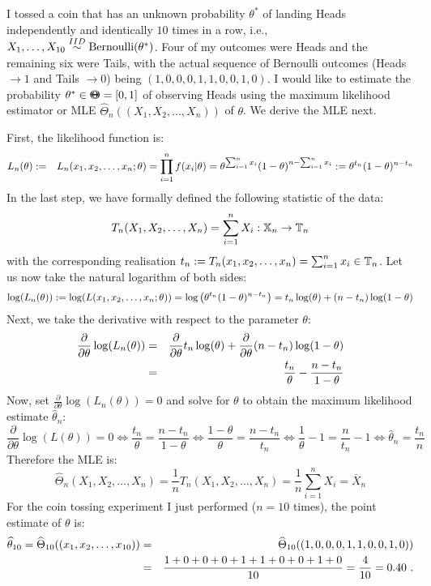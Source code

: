 {\begin{example}\label{EX:CoinTossingML}
I tossed a coin that has an unknown probability $\theta^*$ of landing Heads independently and identically $10$ times in a row, i.e., $X_1,\ldots,X_{10} \overset{IID}{\sim} \mbox{{\rm Bernoulli}}(\theta^*)$.  Four of my outcomes were Heads and the remaining six were Tails, with the actual sequence of Bernoulli outcomes (Heads $\to 1$ and Tails $\to 0$) being $(1,0,0,0,1,1,0,0,1,0)$.  I would like to estimate the probability $\theta^* \in {\Theta}\mspace{-11 mu}{\Theta} = [0,1]$ of observing Heads using the maximum likelihood estimator or MLE $\widehat{\Theta}_n((X_1,X_2,\ldots,X_n))$ of $\theta$. We derive the MLE next.

First, the likelihood function is:
\begin{eqnarray}
L_n(\theta) &:=& L_n(x_1,x_2,\ldots,x_n; \theta)  =  \prod_{i=1}^n f(x_i|\theta) = \theta^{\sum_{i=1}^n x_i} (1-\theta)^ {n-\sum_{i=1}^n x_i} := \theta^{t_n} (1-\theta)^{n-t_n} \notag 
\end{eqnarray}
In the last step, we have formally defined the following statistic of the data: 
$$T_n(X_1,X_2,\ldots,X_n)=\sum_{i=1}^n X_i :  \mathbb{X}_n \rightarrow \mathbb{T}_n$$ with the corresponding realisation $t_n := T_n(x_1,x_2,\ldots,x_n)=\sum_{i=1}^n x_i \in \mathbb{T}_n$.  Let us now take the natural logarithm of both sides:
\begin{eqnarray}
\log(L_n(\theta)) := \log(L(x_1,x_2,\ldots,x_n; \theta))   
= \log \left( \theta^{t_n} (1-\theta)^ {n-t_n} \right) 
= t_n \log(\theta) + (n-t_n) \log(1-\theta) \notag
\end{eqnarray}
Next, we take the derivative with respect to the parameter $\theta$:
\begin{eqnarray}
\frac{\partial}{\partial \theta} \log(L_n(\theta)) 
&=& \frac{\partial}{\partial \theta}  t_n \log(\theta) + \frac{\partial}{\partial \theta}  (n-t_n) \log(1-\theta) \notag \\
&=& \frac{t_n}{\theta} - \frac{n-t_n}{1-\theta} \notag
\end{eqnarray}
Now, set $\frac{\partial}{\partial \theta} \log(L_n(\theta))=0$ and solve for $\theta$ to obtain the maximum likelihood estimate  $\widehat{\theta}_n$:
\[
\frac{\partial}{\partial \theta} \log(L(\theta)) = 0 \iff  
\frac{t_n}{\theta} = \frac{n-t_n}{1-\theta} \iff
\frac{1-\theta}{\theta} = \frac{n-t_n}{t_n} \iff
\frac{1}{\theta}-1 = \frac{n}{t_n}-1 \iff \widehat{\theta}_n = \frac{t_n}{n}
\]
Therefore the MLE is:
\[
\widehat{\Theta}_n(X_1,X_2,\ldots,X_n) = \frac{1}{n}T_n(X_1,X_2,\ldots,X_n) = \frac{1}{n} \sum_{i=1}^n X_i = \overline{X}_n
\]
For the coin tossing experiment I just performed ($n=10$ times), the point estimate of $\theta$ is:
\begin{eqnarray}
\widehat{\theta}_{10} = \widehat{\Theta}_{10}((x_1,x_2,\ldots,x_{10})) 
&=&\widehat{\Theta}_{10}((1,0,0,0,1,1,0,0,1,0)) \notag \\
&=& \frac{1+0+0+0+1+1+0+0+1+0}{10}=\frac{4}{10}=0.40 \notag \ .
\end{eqnarray}
\end{example}
}%

